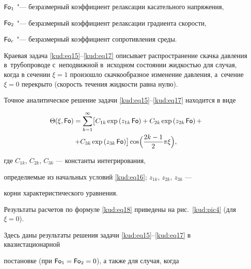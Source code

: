 $\operatorname{\sf Fo}_ 1 $ "--- безразмерный коэффициент релаксации касательного напряжения, 

$\operatorname{\sf Fo}_ {2}$ "--- безразмерный коэффициент релаксации градиента скорости,

$\operatorname{\sf Fo}_r$ "--- безразмерный коэффициент сопротивления среды.





Краевая задача \eqref{kud:eq15}--\eqref{kud:eq17} описывает распространение скачка давления в~трубопроводе с~неподвижной в~исходном состоянии жидкостью для случая, когда в сечении $\xi =1$ произошло скачкообразное изменение давления, а~сечение $\xi =0$ перекрыто (скорость течения жидкости равна нулю). 



Точное аналитическое решение задачи \eqref{kud:eq15}--\eqref{kud:eq17} находится в виде

\begin{multline}

\label{kud:eq18}

 \Theta( \xi,\operatorname{\sf Fo})=

 \sum\limits_{k=1}^\infty 

 \bigl[C_{1k} \exp \left( z_{1k}

\operatorname{\sf Fo} \right)+C_{2k} \exp \left( z_{2k} \operatorname{\sf Fo} \right) + \\ +C_{3k} \exp

\left( z_{3k} \operatorname{\sf Fo} \right) \bigr] 

\cos \Bigl( \frac{2k-1}2 \pi

 \xi \Bigr),

\end{multline}

где $C_{1k} $, $C_{2k} $, $C_{3k} $ --- константы интегрирования,

определяемые из начальных условий \eqref{kud:eq16}; $z_{1k} $, $z_{2k} $, $z_{3k} $ ---

корни характеристического уравнения.



Результаты расчетов по формуле \eqref{kud:eq18} приведены на рис.~\ref{kud:pic4} (для $ \xi=0$). 

Здесь даны результаты решения задачи \eqref{kud:eq15}--\eqref{kud:eq17} в квазистационарной

постановке (при $\operatorname{\sf Fo}_1 =\operatorname{\sf Fo}_2 =0$), а также для случая, когда

